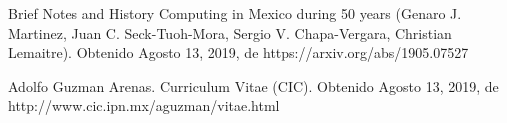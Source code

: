 \documentclass[notitlepage,letterpaper, 11pt]{article}
\begin{document}
\begin{thebibliography}{*}
     Brief Notes and History Computing in Mexico during 50 years
    (Genaro J. Martinez, Juan C. Seck-Tuoh-Mora, Sergio V. Chapa-Vergara, Christian Lemaitre). Obtenido Agosto 13, 2019, de https://arxiv.org/abs/1905.07527
    
      Adolfo Guzman Arenas. Curriculum Vitae
    (CIC). Obtenido Agosto 13, 2019, de http://www.cic.ipn.mx/aguzman/vitae.html
    
\end{thebibliography}
\end{document}
